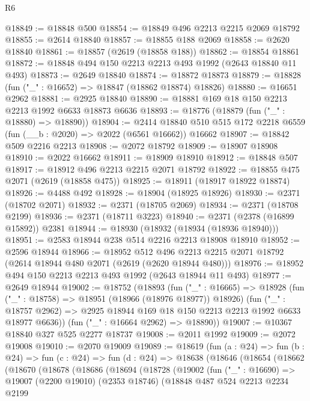 \begin{lexlean}{R6}
\begin{coremodule}
@18849 := @18848 @500
@18854 := @18849 @496 @2213 @2215 @2069 @18792
@18855 := @2614 @18840
@18857 := @18855 @188 @2069
@18858 := @2620 @18840
@18861 := @18857 (@2619 (@18858 @188))
@18862 := @18854 @18861
@18872 := @18848 @494 @150 @2213 @2213 @493 @1992 (@2643 @18840 @11 @493)
@18873 := @2649 @18840
@18874 := @18872 @18873
@18879 := @18828 (fun ("_" : @16652) => @18847 (@18862 @18874) @18826)
@18880 := @16651 @2962
@18881 := @2925 @18840
@18890 := @18881 @169 @18 @150 @2213 @2213 @1992 @6633 @18873 @6636
@18893 := @18776 (@18879 (fun ("_" : @18880) => @18890))
@18904 := @2414 @18840 @510 @515 @172 @2218 @6559 (fun (__b : @2020) => @2022 (@6561 @16662)) @16662
@18907 := @18842 @509 @2216 @2213
@18908 := @2072 @18792
@18909 := @18907 @18908
@18910 := @2022 @16662
@18911 := @18909 @18910
@18912 := @18848 @507
@18917 := @18912 @496 @2213 @2215 @2071 @18792
@18922 := @18855 @475 @2071 (@2619 (@18858 @475))
@18925 := @18911 (@18917 @18922 @18874)
@18926 := @4488 @492
@18928 := @18904 (@18925 @18926)
@18930 := @2371 (@18702 @2071)
@18932 := @2371 (@18705 @2069)
@18934 := @2371 (@18708 @2199)
@18936 := @2371 (@18711 @3223)
@18940 := @2371 (@2378 (@16899 @15892)) @2381
@18944 := @18930 (@18932 (@18934 (@18936 @18940)))
@18951 := @2583 @18944 @238 @514 @2216 @2213 @18908 @18910
@18952 := @2596 @18944
@18966 := @18952
    @512
    @496
    @2213
    @2215
    @2071
    @18792
    (@2614 @18944 @480 @2071 (@2619 (@2620 @18944 @480)))
@18976 := @18952 @494 @150 @2213 @2213 @493 @1992 (@2643 @18944 @11 @493)
@18977 := @2649 @18944
@19002 := @18752
    (@18893
      (fun ("_" : @16665) =>
      @18928
        (fun ("_" : @18758) => @18951 (@18966 (@18976 @18977)) @18926)
        (fun ("_" : @18757 @2962) =>
        @2925 @18944 @169 @18 @150 @2213 @2213 @1992 @6633 @18977 @6636))
      (fun ("_" : @16664 @2962) => @18890))
@19007 := @10367 @18840 @327 @525 @2277 @18737
@19008 := @2011 @1992
@19009 := @2072 @19008
@19010 := @2070 @19009
@19089 := @18619
    (fun (a : @24) =>
    fun (b : @24) =>
    fun (c : @24) =>
    fun (d : @24) =>
    @18638
      (@18646
        (@18654
          (@18662
            (@18670
              (@18678
                (@18686
                  (@18694
                    (@18728
                      (@19002
                        (fun ("_" : @16690) =>
                        @19007
                          (@2200 @19010)
                          (@2353 @18746)
                          (@18848
                            @487
                            @524
                            @2213
                            @2234
                            @2199

\end{coremodule}
\end{lexlean}
